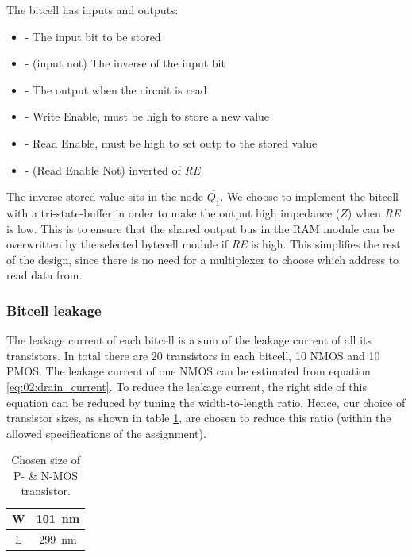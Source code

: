 The bitcell has inputs and outputs:
\begin{itemize}
    \item {} - The input bit to be stored
    \item {} - (input not) The inverse of the input bit
    \item {} - The output when the circuit is read
    \item {} - Write Enable, must be high to store a new value
    \item {} - Read Enable, must be high to set outp to the stored value
    \item {} - (Read Enable Not) inverted of \textit{RE}
\end{itemize}

The inverse stored value sits in the node $\overline{Q_1}$. We choose to implement the bitcell with a tri-state-buffer in order to make the output high impedance ($Z$) when \textit{RE} is low. This is to ensure that the shared output bus in the RAM module can be overwritten by the selected bytecell module if \textit{RE} is high. This simplifies the rest of the design, since there is no need for a multiplexer to choose which address to read data from.

\subsubsection{Bitcell leakage}
The leakage current of each bitcell is a sum of the leakage current of all its transistors. In total there are 20 transistors in each bitcell, 10 NMOS and 10 PMOS. The leakage current of one NMOS can be estimated from equation \ref{eq:02:drain_current}. To reduce the leakage current, the right side of this equation can be reduced by tuning the width-to-length ratio. Hence, our choice of transistor sizes, as shown in table \ref{tab:03:transistor_size}, are chosen to reduce this ratio (within the allowed specifications of the assignment).

\begin{table}[H]
    \centering
    \caption{Chosen size of P- \& N-MOS transistor.}
    \label{tab:03:transistor_size}
    \begin{tabular}{|c|c|}
                                \hline
         W  &  \SI{101}{nm} \\  \hline
         L  &  \SI{299}{nm} \\  \hline
    \end{tabular}
\end{table}

